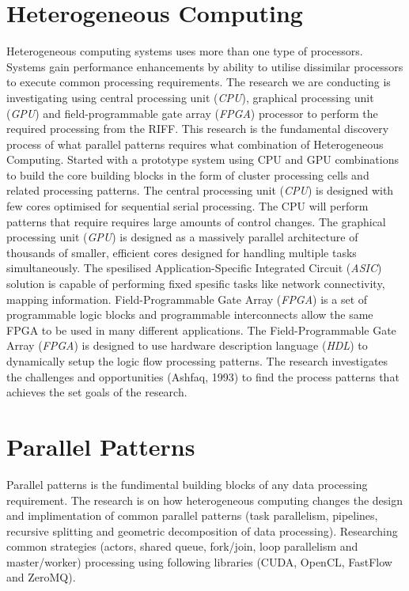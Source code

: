 \documentclass{acm_proc_article-sp}
\begin{document}
\section{Heterogeneous Computing}
Heterogeneous computing systems uses more than one type of processors. Systems gain performance enhancements by ability to utilise dissimilar processors to execute common processing requirements. The research we are conducting is investigating using central processing unit (\textit{CPU}), graphical processing unit (\textit{GPU}) and field-programmable gate array (\textit{FPGA}) processor to perform the required processing from the RIFF. This research is the fundamental discovery process of what parallel patterns requires what combination of Heterogeneous Computing. Started with a prototype system using CPU and GPU combinations to build the core building blocks in the form of cluster processing cells and related processing patterns. The central processing unit (\textit{CPU}) is designed with few cores optimised for sequential serial processing. The CPU will perform patterns that require requires large amounts of control changes. The graphical processing unit (\textit{GPU}) is designed as a massively parallel architecture of thousands of smaller, efficient cores designed for handling multiple tasks simultaneously. The spesilised Application-Specific Integrated Circuit (\textit{ASIC}) solution is capable of performing fixed spesific tasks like network connectivity, mapping information. Field-Programmable Gate Array (\textit{FPGA}) is a set of programmable logic blocks and programmable interconnects allow the same FPGA to be used in many different applications. The Field-Programmable Gate Array (\textit{FPGA}) is designed to use hardware description language (\textit{HDL}) to dynamically setup the logic flow processing patterns. The research investigates the challenges and opportunities (Ashfaq, 1993) to find the process patterns that achieves the set goals of the research.  
\section{Parallel Patterns}
Parallel patterns is the fundimental building blocks of any data processing requirement. The research is on how heterogeneous computing changes the design and implimentation of common parallel patterns (task parallelism, pipelines, recursive splitting and geometric decomposition of data processing). Researching common strategies (actors, shared queue, fork/join, loop parallelism and master/worker) processing using following libraries (CUDA, OpenCL, FastFlow and ZeroMQ).
\end{document}
